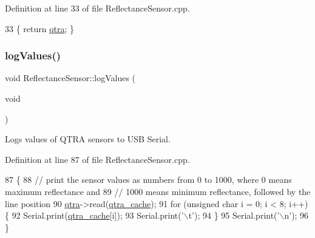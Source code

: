 Definition at line 33 of file Reflectance\+Sensor.\+cpp.


\begin{DoxyCode}
33 \{ \textcolor{keywordflow}{return} \hyperlink{class_reflectance_sensor_a1eb0a090b619705b0234cea224400829}{qtra}; \}
\end{DoxyCode}
\mbox{\label{class_reflectance_sensor_a637d9833bd917e331908917fc777ac19}} 
\subsubsection{\texorpdfstring{log\+Values()}{logValues()}}
{\footnotesize\ttfamily void Reflectance\+Sensor\+::log\+Values (\begin{DoxyParamCaption}\item[{void}]{ }\end{DoxyParamCaption})}



Logs values of Q\+T\+RA sensors to U\+SB Serial. 



Definition at line 87 of file Reflectance\+Sensor.\+cpp.


\begin{DoxyCode}
87                                       \{
88     \textcolor{comment}{// print the sensor values as numbers from 0 to 1000, where 0 means maximum reflectance and}
89     \textcolor{comment}{// 1000 means minimum reflectance, followed by the line position}
90     \hyperlink{class_reflectance_sensor_a1eb0a090b619705b0234cea224400829}{qtra}->read(\hyperlink{class_reflectance_sensor_ab4b708129419215a57eec3b0af611542}{qtra\_cache});
91     \textcolor{keywordflow}{for} (\textcolor{keywordtype}{unsigned} \textcolor{keywordtype}{char} i = 0; i < 8; i++) \{
92         Serial.print(\hyperlink{class_reflectance_sensor_ab4b708129419215a57eec3b0af611542}{qtra\_cache}[i]);
93         Serial.print(\textcolor{charliteral}{'\(\backslash\)t'});
94     \}
95     Serial.print(\textcolor{charliteral}{'\(\backslash\)n'});
96 \}
\end{DoxyCode}
\mbox{\label{class_reflectance_sensor_a30b767c95bec679ff638765050c770e2}} 
